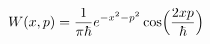 \documentclass[preview]{standalone}
\begin{document}
\begin{align*}
W(x,p)=\frac{1}{\pi\hbar}e^{-x^2-p^2}\cos\Bigl(\frac{2xp}{\hbar}\Bigr)
\end{align*}
\end{document}
